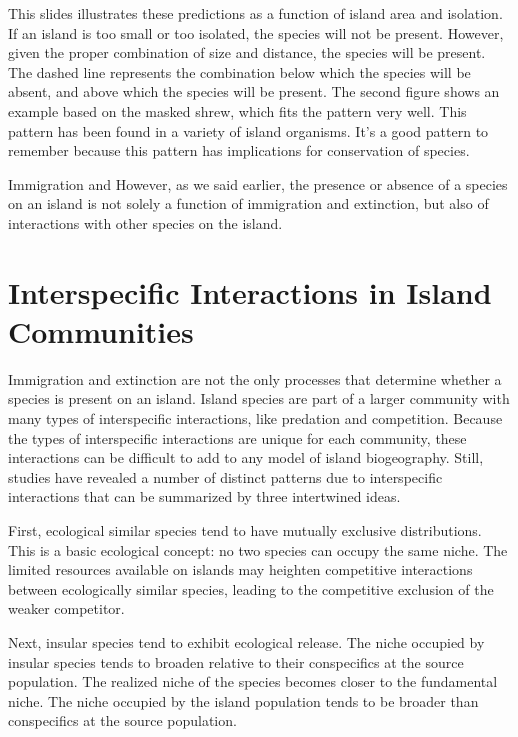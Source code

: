 \documentclass[letterpaper]{tufte-handout}
\begin{document}
This slides illustrates these predictions as a function of island area and isolation.  If an island is too small or too isolated, the species will not be present. However, given the proper combination of size and distance, the species will be present.  The dashed line represents the combination below which the species will be absent, and above which the species will be present. The second figure shows an example based on the masked shrew, which fits the pattern very well.  This pattern has been found in a variety of island organisms. It's a good pattern to remember because this pattern has implications for conservation of species.  

Immigration and However, as we said earlier, the presence or absence of a species on an island is not solely a function of immigration and extinction, but also of interactions with other species on the island.

\section{Interspecific Interactions in Island Communities}
Immigration and extinction are not the only processes that determine whether a species is present on an island.  Island species are part of a larger community with many types of interspecific interactions, like predation and competition. Because the types of interspecific interactions are unique for each community, these interactions can be difficult to add to any model of island biogeography. Still, studies have revealed a number of distinct patterns due to interspecific interactions that can be summarized by three intertwined ideas.

First, ecological similar species tend to have mutually exclusive distributions.  This is a basic ecological concept: no two species can occupy the same niche.  The limited resources available on islands may heighten competitive interactions between ecologically similar species, leading to the competitive exclusion of the weaker competitor.  

Next,  insular species tend to exhibit ecological release.  The niche occupied by insular species tends to broaden relative to their conspecifics at the source population. The realized niche of the species becomes closer to the fundamental niche. The niche occupied by the island population tends to be broader than conspecifics at the source population.
\end{document}
